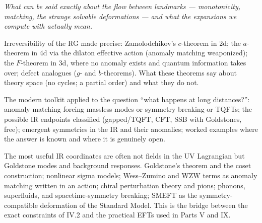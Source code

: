 
\noin \emph{What can be said exactly about the flow between landmarks --- monotonicity, matching, the strange solvable deformations --- and what the expansions we compute with actually mean.}

Irreversibility of the RG made precise: Zamolodchikov's $c$-theorem in 2d; the $a$-theorem in 4d via the dilaton effective action (anomaly matching weaponized); the $F$-theorem in 3d, where no anomaly exists and quantum information takes over; defect analogues ($g$- and $b$-theorems). What these theorems say about theory space (no cycles; a partial order) and what they do not.

The modern toolkit applied to the question ``what happens at long distances?'': anomaly matching forcing massless modes or symmetry breaking or TQFTs; the possible IR endpoints classified (gapped/TQFT, CFT, SSB with Goldstones, free); emergent symmetries in the IR and their anomalies; worked examples where the answer is known and where it is genuinely open.

The most useful IR coordinates are often not fields in the UV Lagrangian but Goldstone modes and background responses. Goldstone's theorem and the coset construction; nonlinear sigma models; Wess--Zumino and WZW terms as anomaly matching written in an action; chiral perturbation theory and pions; phonons, superfluids, and spacetime-symmetry breaking; SMEFT as the symmetry-compatible deformation of the Standard Model. This is the bridge between the exact constraints of IV.2 and the practical EFTs used in Parts V and IX.

